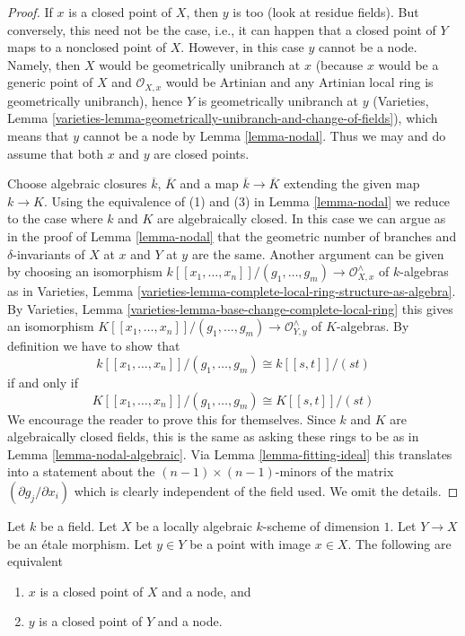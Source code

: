 \begin{proof}
If $x$ is a closed point of $X$, then $y$ is too (look at residue fields).
But conversely, this need not be the case, i.e., it can happen that a
closed point of $Y$ maps to a nonclosed point of $X$. However, in this
case $y$ cannot be a node. Namely, then $X$ would be geometrically
unibranch at $x$ (because $x$ would be a generic point of $X$ and
$\mathcal{O}_{X, x}$ would be Artinian and any Artinian local ring is
geometrically unibranch), hence $Y$ is geometrically unibranch at $y$
(Varieties, Lemma
\ref{varieties-lemma-geometrically-unibranch-and-change-of-fields}),
which means that $y$ cannot be a node by Lemma \ref{lemma-nodal}.
Thus we may and do assume that both $x$ and $y$ are closed points.

\medskip\noindent
Choose algebraic closures $\overline{k}$, $\overline{K}$
and a map $\overline{k} \to \overline{K}$ extending the
given map $k \to K$. Using the equivalence of (1) and (3)
in Lemma \ref{lemma-nodal}
we reduce to the case where $k$ and $K$ are algebraically closed.
In this case we can argue as in the proof of
Lemma \ref{lemma-nodal} that the geometric number of branches
and $\delta$-invariants of $X$ at $x$ and $Y$ at $y$ are the same.
Another argument can be given by choosing an isomorphism
$k[[x_1, \ldots, x_n]]/(g_1, \ldots, g_m) \to \mathcal{O}_{X, x}^\wedge$
of $k$-algebras as in Varieties, Lemma
\ref{varieties-lemma-complete-local-ring-structure-as-algebra}.
By Varieties, Lemma \ref{varieties-lemma-base-change-complete-local-ring}
this gives an isomorphism
$K[[x_1, \ldots, x_n]]/(g_1, \ldots, g_m) \to \mathcal{O}_{Y, y}^\wedge$
of $K$-algebras. By definition we have to show that
$$
k[[x_1, \ldots, x_n]]/(g_1, \ldots, g_m) \cong k[[s, t]]/(st)
$$
if and only if
$$
K[[x_1, \ldots, x_n]]/(g_1, \ldots, g_m) \cong K[[s, t]]/(st)
$$
We encourage the reader to prove this for themselves.
Since $k$ and $K$ are algebraically closed fields, this is the same as
asking these rings to be as in Lemma \ref{lemma-nodal-algebraic}.
Via Lemma \ref{lemma-fitting-ideal} this translates into a statement
about the $(n - 1) \times (n - 1)$-minors of the matrix
$(\partial g_j/\partial x_i)$ which is clearly independent of the
field used. We omit the details.
\end{proof}

\begin{lemma}
\label{lemma-node-etale-local}
Let $k$ be a field. Let $X$ be a locally algebraic
$k$-scheme of dimension $1$. Let $Y \to X$ be an \'etale morphism.
Let $y \in Y$ be a point with image $x \in X$. The following are equivalent
\begin{enumerate}
\item $x$ is a closed point of $X$ and a node, and
\item $y$ is a closed point of $Y$ and a node.
\end{enumerate}
\end{lemma}

